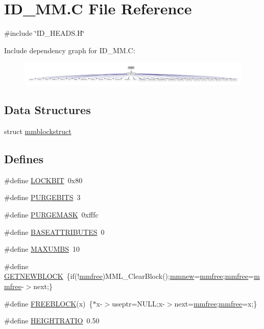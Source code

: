\hypertarget{ID__MM_8C}{
\section{ID\_\-MM.C File Reference}
\label{ID__MM_8C}
}
{\ttfamily \#include \char`\"{}ID\_\-HEADS.H\char`\"{}}\par
Include dependency graph for ID\_\-MM.C:
\nopagebreak
\begin{figure}[H]
\begin{center}
\leavevmode
\includegraphics[width=400pt]{ID__MM_8C__incl}
\end{center}
\end{figure}
\subsection*{Data Structures}
\begin{DoxyCompactItemize}
\item 
struct \hyperlink{structmmblockstruct}{mmblockstruct}
\end{DoxyCompactItemize}
\subsection*{Defines}
\begin{DoxyCompactItemize}
\item 
\#define \hyperlink{ID__MM_8C_aabc3e2420aaa1894ef93db2e79d46190}{LOCKBIT}~0x80
\item 
\#define \hyperlink{ID__MM_8C_a15d145cd64571b57c71e4d6febbad2b1}{PURGEBITS}~3
\item 
\#define \hyperlink{ID__MM_8C_a33789ff93c545544d0fbc18b9ee5af46}{PURGEMASK}~0xfffc
\item 
\#define \hyperlink{ID__MM_8C_ac89d2b87b2f92d28a64ede5b5d54de53}{BASEATTRIBUTES}~0
\item 
\#define \hyperlink{ID__MM_8C_a34224dc207eab1f973bca289f2929b2c}{MAXUMBS}~10
\item 
\#define \hyperlink{ID__MM_8C_ab83743123fce30a521eb7f46dec877d7}{GETNEWBLOCK}~\{if(!\hyperlink{ID__MM_8C_abdac14ac0a96a28e4b111015263bd9fa}{mmfree})MML\_\-ClearBlock();\hyperlink{ID__MM_8C_ae7f89fec09993591be9e423abd165413}{mmnew}=\hyperlink{ID__MM_8C_abdac14ac0a96a28e4b111015263bd9fa}{mmfree};\hyperlink{ID__MM_8C_abdac14ac0a96a28e4b111015263bd9fa}{mmfree}=\hyperlink{ID__MM_8C_abdac14ac0a96a28e4b111015263bd9fa}{mmfree}-\/$>$next;\}
\item 
\#define \hyperlink{ID__MM_8C_aa6e39e23784d140eccabf75ee388335e}{FREEBLOCK}(x)~\{$\ast$x-\/$>$useptr=NULL;x-\/$>$next=\hyperlink{ID__MM_8C_abdac14ac0a96a28e4b111015263bd9fa}{mmfree};\hyperlink{ID__MM_8C_abdac14ac0a96a28e4b111015263bd9fa}{mmfree}=x;\}
\item 
\#define \hyperlink{ID__MM_8C_a44c330a526c90af7338c21adcc69fa63}{HEIGHTRATIO}~0.50
\end{DoxyCompactItemize}
